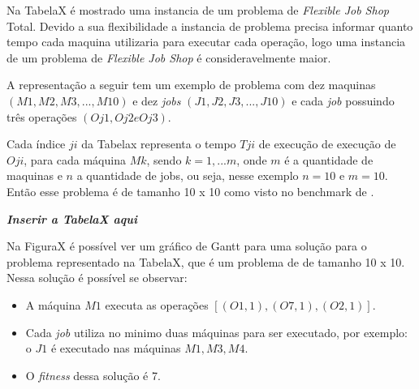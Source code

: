            Na TabelaX é mostrado uma instancia de um problema de \textit{Flexible Job Shop} Total. Devido a sua flexibilidade a instancia de problema precisa informar quanto tempo cada maquina utilizaria para executar cada operação, logo uma instancia de um problema de \textit{Flexible Job Shop} é consideravelmente maior.\newline

            A representação a seguir tem um exemplo de problema com dez maquinas $(M1, M2, M3, ..., M10)$ e dez \textit{jobs} $(J1, J2, J3, ..., J10)$ e cada \textit{job} possuindo três operações $(Oj1, Oj2 e Oj3)$.\newline

            Cada índice $ji$ da Tabelax representa o tempo $Tji$ de execução de execução de $Oji$, para cada máquina $Mk$, sendo $k = 1,... m$, onde $m$ é a quantidade de maquinas e $n$ a quantidade de jobs, ou seja, nesse exemplo $n = 10$ e $m = 10$.\newline
            Então esse problema é de tamanho 10 x 10 como visto no benchmark de \cite{Kacem2002}.\newline

            \textit{\textbf{Inserir a TabelaX aqui}}\newline



            Na FiguraX é possível ver um gráfico de Gantt para uma solução para o problema representado na TabelaX, que é um problema de \cite{Kacem2002} de tamanho 10 x 10. Nessa solução é possível se observar:
            \begin{itemize}
                \item A máquina $M1$ executa as operações $[(O1,1), (O7,1), (O2,1)]$.
                \item Cada \textit{job} utiliza no minimo duas máquinas para ser executado, por exemplo: o $J1$ é executado nas máquinas $M1 , M3, M4$.
                \item O \textit{fitness} dessa solução é 7.
            \end{itemize}

